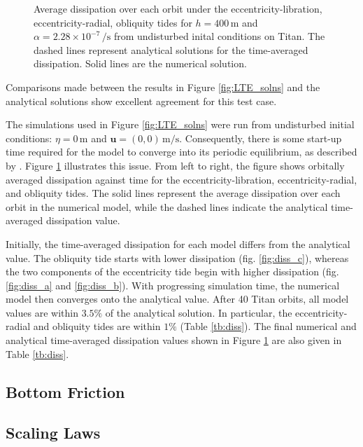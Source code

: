 \begin{figure}[!t]
\begin{subfigure}{\linewidth}
\subcaption{\label{fig:diss_c}}
\end{subfigure}
\vspace*{-0.8cm}
\caption{Average dissipation over each orbit under the eccentricity-libration, eccentricity-radial, obliquity tides for $h = 400 \, \si{\metre}$ and $\alpha = 2.28 \times 10^{-7} \, \si{\per\second}$ from undisturbed inital conditions on Titan. The dashed lines represent analytical solutions for the time-averaged dissipation. Solid lines are the numerical solution. \label{fig:diss}}
\end{figure}

Comparisons made between the results in Figure \ref{fig:LTE_solns} and the analytical solutions show excellent agreement for this test case.

The simulations used in Figure \ref{fig:LTE_solns} were run from undisturbed initial conditions: \hbox{$\eta = 0 \, \si{\metre}$} and \hbox{$\bm{u} = (0,0) \, \si{\metre\per\second}$}. Consequently, there is some start-up time required for the model to converge into its periodic equilibrium, as described by \citet{sears1995tidal}. Figure \ref{fig:diss} illustrates this issue. From left to right, the figure shows orbitally averaged dissipation against time for the eccentricity-libration, eccentricity-radial, and obliquity tides.  The solid lines represent the average dissipation over each orbit in the numerical model, while the dashed lines indicate the analytical time-averaged dissipation value. 

Initially, the time-averaged dissipation for each model differs from the analytical value. The obliquity tide starts with lower dissipation (fig. \ref{fig:diss_c}), whereas the two components of the eccentricity tide begin with higher dissipation (fig. \ref{fig:diss_a} and \ref{fig:diss_b}). With progressing simulation time, the numerical model then converges onto the analytical value. After 40 Titan orbits, all model values are within $3.5 \si{\percent}$ of the analytical solution. In particular, the eccentricity-radial and obliquity tides are within $1 \si{\percent}$ (Table \ref{tb:diss}). The final numerical and analytical time-averaged dissipation values shown in Figure \ref{fig:diss} are also given in Table \ref{tb:diss}.



\subsection{Bottom Friction \label{subsec:result_bottom}}

\subsection{Scaling Laws \label{subsec:scaling}}
